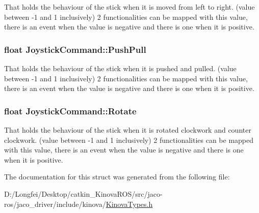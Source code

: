That holds the behaviour of the stick when it is moved from left to right. (value between -\/1 and 1 inclusively) 2 functionalities can be mapped with this value, there is an event when the value is negative and there is one when it is positive. 

\subsubsection[{\texorpdfstring{Push\+Pull}{PushPull}}]{\setlength{\rightskip}{0pt plus 5cm}float Joystick\+Command\+::\+Push\+Pull}\hypertarget{structJoystickCommand_af530128a7a89e383f88a4c2b798a66b4}{}\label{structJoystickCommand_af530128a7a89e383f88a4c2b798a66b4}


That holds the behaviour of the stick when it is pushed and pulled. (value between -\/1 and 1 inclusively) 2 functionalities can be mapped with this value, there is an event when the value is negative and there is one when it is positive. 

\subsubsection[{\texorpdfstring{Rotate}{Rotate}}]{\setlength{\rightskip}{0pt plus 5cm}float Joystick\+Command\+::\+Rotate}\hypertarget{structJoystickCommand_a02fece0bcf6cfc2135f294a3dbe9db4e}{}\label{structJoystickCommand_a02fece0bcf6cfc2135f294a3dbe9db4e}


That holds the behaviour of the stick when it is rotated clockwork and counter clockwork. (value between -\/1 and 1 inclusively) 2 functionalities can be mapped with this value, there is an event when the value is negative and there is one when it is positive. 



The documentation for this struct was generated from the following file\+:\begin{DoxyCompactItemize}
\item 
D\+:/\+Longfei/\+Desktop/catkin\+\_\+\+Kinova\+R\+O\+S/src/jaco-\/ros/jaco\+\_\+driver/include/kinova/\hyperlink{KinovaTypes_8h}{Kinova\+Types.\+h}\end{DoxyCompactItemize}
